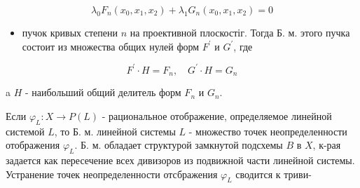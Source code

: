 \documentclass[10pt]{article}
\begin{document}
\[

\lambda_{0} F_{n}\left(x_{0}, x_{1}, x_{2}\right)+\lambda_{1} G_{n}\left(x_{0}, x_{1}, x_{2}\right)=0

\]



\begin{itemize}

  \item пучок кривых степени $n$ на проективной плоскостіг. Тогда Б. м. этого пучка состоит из множества общих нулей форм $F^{\prime}$ и $G^{\prime}$, где

\end{itemize}



\[

F^{\prime} \cdot H=F_{n}, \quad G^{\prime} \cdot H=G_{n}

\]



a $H$ - наибольший общий делитель форм $F_{n}$ и $G_{n}$.



Если $\varphi_{L}: X \rightarrow P(L)$ - рациональное отображение, определяемое линейной системой $L$, то Б. м. линейной системы $L$ - множество точек неопределенности отображения $\varphi_{L}$. Б. м. обладает структурой замкнутой подсхемы $B$ в $X$, к-рая задается как пересечение всех дивизоров из подвижной части линейной системы. Устранение точек неопределенности отсбражения $\varphi_{L}$ сводится к триви-
\end{document}
